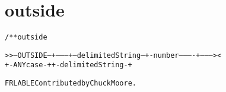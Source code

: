 \section{outside}
\begin{shaded}
\begin{alltt}
/** outside


   >>--OUTSIDE--+---------+--delimitedString--+-number----------+---------><
                +-ANYcase-+                   +-delimitedString-+


  FRLABLE Contributed by Chuck Moore.

\end{alltt}
\end{shaded}
